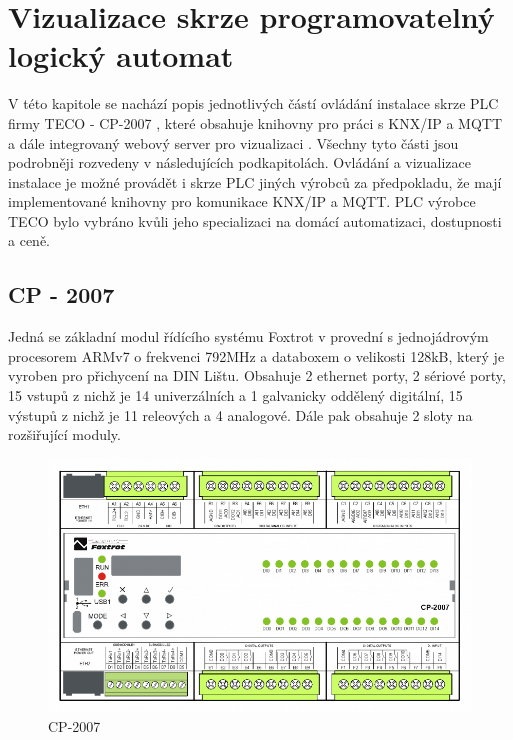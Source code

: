 \chapter{Vizualizace skrze programovatelný logický automat}
\label{sec:vizualizace_automat}
V této kapitole se nachází popis jednotlivých částí ovládání instalace skrze PLC firmy TECO - CP-2007 \cite{TECO}, které obsahuje knihovny pro práci s KNX/IP \cite{KNXlib} a MQTT \cite{MQTTlib} a dále integrovaný webový server pro vizualizaci \cite{WebMaker}. Všechny tyto části jsou podrobněji rozvedeny v následujících podkapitolách.
Ovládání a vizualizace instalace je možné provádět i skrze PLC jiných výrobců za předpokladu, že mají implementované knihovny pro komunikace KNX/IP a MQTT. PLC výrobce TECO bylo vybráno kvůli jeho specializaci na domácí automatizaci, dostupnosti a ceně.
\section{CP - 2007}
Jedná se základní modul řídícího systému Foxtrot v provední s jednojádrovým procesorem ARMv7 o frekvenci 792MHz a databoxem o velikosti 128kB, který je vyroben pro přichycení na DIN Lištu. Obsahuje 2 ethernet porty, 2 sériové porty, 15 vstupů z nichž je 14 univerzálních a 1 galvanicky oddělený digitální, 15 výstupů z nichž je 11 releových a 4 analogové. Dále pak obsahuje 2 sloty na rozšiřující moduly. \cite{TECO}

\begin{figure}[!ht]
    \begin{center}
        \includegraphics[scale=0.7]{obrazky/CP-2007.png}
    \end{center}
    \caption[CP-2007 \cite{TECO}]{CP-2007 \cite{TECO}}
    \label{fig:CP-2007}
\end{figure}

